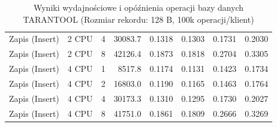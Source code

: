 \begin{table}[ht]
{\begin{tabular}{llcrrrrr}
Zapis (Insert) & 2 CPU & 4 & 30083.7 & 0.1318 & 0.1303 & 0.1731 & 0.2030 \\
Zapis (Insert) & 2 CPU & 8 & 42126.4 & 0.1873 & 0.1818 & 0.2704 & 0.3305 \\
Zapis (Insert) & 4 CPU & 1 & 8517.8 & 0.1174 & 0.1131 & 0.1423 & 0.1734 \\
Zapis (Insert) & 4 CPU & 2 & 16803.0 & 0.1190 & 0.1165 & 0.1463 & 0.1764 \\
Zapis (Insert) & 4 CPU & 4 & 30173.3 & 0.1310 & 0.1295 & 0.1730 & 0.2027 \\
Zapis (Insert) & 4 CPU & 8 & 41751.0 & 0.1861 & 0.1809 & 0.2666 & 0.3269 \\
\bottomrule
\end{tabular}%
}
\caption{Wyniki wydajnościowe i opóźnienia operacji bazy danych TARANTOOL (Rozmiar rekordu: 128 B, 100k operacji/klient)}
\label{tab:latency_tarantool_small_100000}
\end{table}
